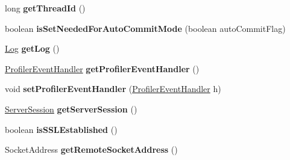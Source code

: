 \begin{DoxyCompactItemize}
\mbox{\label{interfacecom_1_1mysql_1_1cj_1_1_session_a01afd0778a66788ef0d93cb9c20baf5a}} 
long {\bfseries get\+Thread\+Id} ()
\item 
\mbox{\label{interfacecom_1_1mysql_1_1cj_1_1_session_a3f747951ef258e5219237177aa3d4311}} 
boolean {\bfseries is\+Set\+Needed\+For\+Auto\+Commit\+Mode} (boolean auto\+Commit\+Flag)
\item 
\mbox{\label{interfacecom_1_1mysql_1_1cj_1_1_session_a25f2c23d8ac5ae3e87491a66aabddceb}} 
\mbox{\hyperlink{interfacecom_1_1mysql_1_1cj_1_1log_1_1_log}{Log}} {\bfseries get\+Log} ()
\item 
\mbox{\label{interfacecom_1_1mysql_1_1cj_1_1_session_ae756dd958f6327818e84c16066b288df}} 
\mbox{\hyperlink{interfacecom_1_1mysql_1_1cj_1_1log_1_1_profiler_event_handler}{Profiler\+Event\+Handler}} {\bfseries get\+Profiler\+Event\+Handler} ()
\item 
\mbox{\label{interfacecom_1_1mysql_1_1cj_1_1_session_a1ecb6f06b795dd7d51c0622bef9b1047}} 
void {\bfseries set\+Profiler\+Event\+Handler} (\mbox{\hyperlink{interfacecom_1_1mysql_1_1cj_1_1log_1_1_profiler_event_handler}{Profiler\+Event\+Handler}} h)
\item 
\mbox{\label{interfacecom_1_1mysql_1_1cj_1_1_session_afbb4c17c563ed89e60172341fbea39ca}} 
\mbox{\hyperlink{interfacecom_1_1mysql_1_1cj_1_1protocol_1_1_server_session}{Server\+Session}} {\bfseries get\+Server\+Session} ()
\item 
\mbox{\label{interfacecom_1_1mysql_1_1cj_1_1_session_a495638620a1d409d7da49b3cedf0e41d}} 
boolean {\bfseries is\+S\+S\+L\+Established} ()
\item 
\mbox{\label{interfacecom_1_1mysql_1_1cj_1_1_session_aa003329ef0d9384f7fccc8386d125c6d}} 
Socket\+Address {\bfseries get\+Remote\+Socket\+Address} ()
\item 
\mbox{\label{interfacecom_1_1mysql_1_1cj_1_1_session_a04063248e91bc3aa9dbe8d4db1d0a4c2}} 

\end{DoxyCompactItemize}
